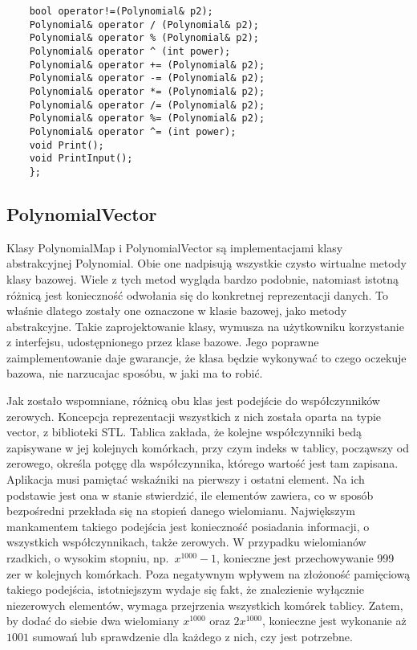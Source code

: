 \documentclass[oneside,a4paper]{book}
\begin{document}
\begin{lstlisting}
	bool operator!=(Polynomial& p2);
	Polynomial& operator / (Polynomial& p2);
	Polynomial& operator % (Polynomial& p2);
	Polynomial& operator ^ (int power);
	Polynomial& operator += (Polynomial& p2);
	Polynomial& operator -= (Polynomial& p2);
	Polynomial& operator *= (Polynomial& p2);
	Polynomial& operator /= (Polynomial& p2);
	Polynomial& operator %= (Polynomial& p2);
	Polynomial& operator ^= (int power);
	void Print();
	void PrintInput();
	};
	\end{lstlisting}
	
	\subsection{PolynomialVector}
	
	Klasy PolynomialMap i PolynomialVector są implementacjami klasy abstrakcyjnej Polynomial. Obie one nadpisują wszystkie czysto wirtualne metody klasy bazowej. Wiele z tych metod wygląda bardzo podobnie, natomiast istotną różnicą jest konieczność odwołania się do konkretnej reprezentacji danych. To właśnie dlatego zostały one oznaczone w klasie bazowej, jako metody abstrakcyjne. Takie zaprojektowanie klasy, wymusza na użytkowniku korzystanie z interfejsu, udostępnionego przez klase bazowe. Jego poprawne zaimplementowanie daje gwarancje, że klasa będzie wykonywać to czego oczekuje bazowa, nie narzucajac sposóbu, w jaki ma to robić.
	
	Jak zostało wspomniane, różnicą obu klas jest podejście do współczynników zerowych. Koncepcja reprezentacji wszystkich z nich została oparta na typie vector, z biblioteki STL. Tablica zakłada, że kolejne współczynniki bedą zapisywane w jej kolejnych komórkach, przy czym indeks w tablicy, począwszy od zerowego, określa potęgę dla współczynnika, którego wartość jest tam zapisana. Aplikacja musi pamiętać wskaźniki na pierwszy i ostatni element. Na ich podstawie jest ona w stanie stwierdzić, ile elementów zawiera, co w sposób bezpośredni przekłada się na stopień danego wielomianu. Największym mankamentem takiego podejścia jest konieczność posiadania informacji, o wszystkich współczynnikach, także zerowych. W przypadku wielomianów rzadkich, o wysokim stopniu, np.\ $x^{1000}-1$, konieczne jest przechowywanie 999 zer w kolejnych komórkach. Poza negatywnym wpływem na złożoność pamięciową takiego podejścia, istotniejszym wydaje się fakt, że znalezienie wyłącznie niezerowych elementów, wymaga przejrzenia wszystkich komórek tablicy. Zatem, by dodać do siebie dwa wielomiany $x^{1000}$ oraz $2x^{1000}$, konieczne jest wykonanie aż $1001$ sumowań lub sprawdzenie dla każdego z nich, czy jest potrzebne.
	
\end{document}
